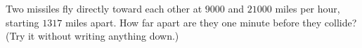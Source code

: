 Two missiles fly directly toward each other at $9000$ and $21000$ miles per hour, starting $1317$ miles apart. How far apart are they one minute before they collide? (Try it without writing anything down.)
